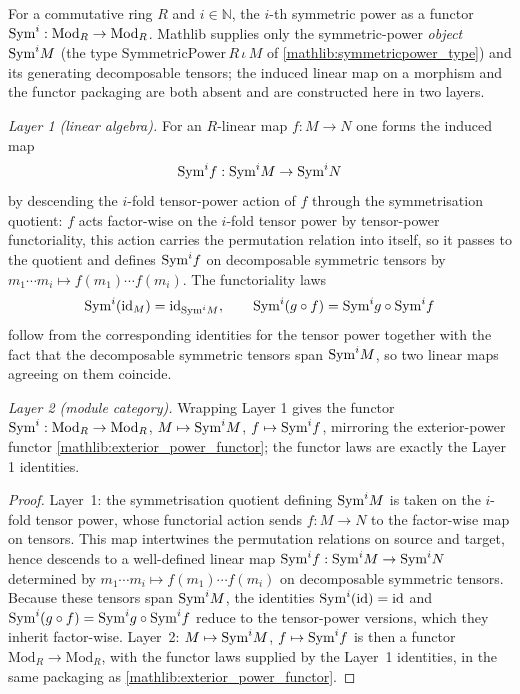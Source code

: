 \begin{lemma}
  \label{found:modulecat_sym_power}
  For a commutative ring \(R\) and \(i\in\mathbb N\), the \(i\)-th symmetric power
  as a functor \(\mathrm{Sym}^i:\mathrm{Mod}_R\to\mathrm{Mod}_R\).  Mathlib supplies only
  the symmetric-power \emph{object} \(\mathrm{Sym}^i M\) (the type
  \(\mathrm{SymmetricPower}\,R\,\iota\,M\) of \cref{mathlib:symmetricpower_type})
  and its generating decomposable tensors; the induced linear map on a morphism
  and the functor packaging are both absent and are constructed here in two
  layers.

  \emph{Layer 1 (linear algebra).}  For an \(R\)-linear map \(f:M\to N\) one
  forms the induced map
  \[
    \mathrm{Sym}^i f:\mathrm{Sym}^i M\to\mathrm{Sym}^i N
  \]
  by descending the \(i\)-fold tensor-power action of \(f\) through the
  symmetrisation quotient: \(f\) acts factor-wise on the \(i\)-fold tensor power
  by tensor-power functoriality, this action carries the permutation relation
  into itself, so it passes to the quotient and defines \(\mathrm{Sym}^i f\) on
  decomposable symmetric tensors by \(m_1\cdots m_i\mapsto f(m_1)\cdots f(m_i)\).
  The functoriality laws
  \[
    \mathrm{Sym}^i(\mathrm{id}_M)=\mathrm{id}_{\mathrm{Sym}^i M},\qquad
    \mathrm{Sym}^i(g\circ f)=\mathrm{Sym}^i g\circ\mathrm{Sym}^i f
  \]
  follow from the corresponding identities for the tensor power together with the
  fact that the decomposable symmetric tensors span \(\mathrm{Sym}^i M\), so two linear
  maps agreeing on them coincide.

  \emph{Layer 2 (module category).}  Wrapping Layer 1 gives the functor
  \(\mathrm{Sym}^i:\mathrm{Mod}_R\to\mathrm{Mod}_R\), \(M\mapsto\mathrm{Sym}^i M\),
  \(f\mapsto\mathrm{Sym}^i f\), mirroring the exterior-power functor
  \cref{mathlib:exterior_power_functor}; the functor laws are exactly the
  Layer 1 identities.
\end{lemma}

\begin{proof}
  \leanok
  Layer~1: the symmetrisation quotient defining \(\mathrm{Sym}^i M\) is taken on the
  \(i\)-fold tensor power, whose functorial action sends \(f:M\to N\) to the
  factor-wise map on tensors.  This map intertwines the permutation relations on
  source and target, hence descends to a well-defined linear map
  \(\mathrm{Sym}^i f:\mathrm{Sym}^i M\to\mathrm{Sym}^i N\) determined by
  \(m_1\cdots m_i\mapsto f(m_1)\cdots f(m_i)\) on decomposable symmetric tensors.
  Because these tensors span \(\mathrm{Sym}^i M\), the identities
  \(\mathrm{Sym}^i(\mathrm{id})=\mathrm{id}\) and
  \(\mathrm{Sym}^i(g\circ f)=\mathrm{Sym}^i g\circ\mathrm{Sym}^i f\) reduce to the tensor-power versions,
  which they inherit factor-wise.  Layer~2: \(M\mapsto\mathrm{Sym}^i M\),
  \(f\mapsto\mathrm{Sym}^i f\) is then a functor \(\mathrm{Mod}_R\to\mathrm{Mod}_R\), with
  the functor laws supplied by the Layer~1 identities, in the same packaging as
  \cref{mathlib:exterior_power_functor}.
\end{proof}

